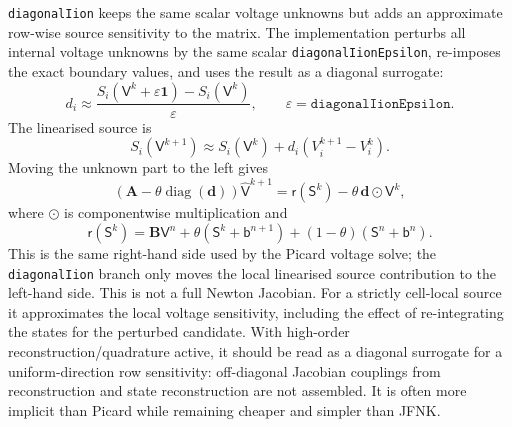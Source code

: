 \documentclass[11pt,a4paper]{article}
\newcommand{\code}[1]{\texttt{\small #1}}
\newcommand{\Aimp}{\mathbf{A}}
\newcommand{\Bimp}{\mathbf{B}}
\begin{document}
\code{diagonalIion} keeps the same scalar voltage unknowns but adds an
approximate row-wise source sensitivity to the matrix. The implementation
perturbs all internal voltage unknowns by the same scalar
\code{diagonalIionEpsilon}, re-imposes the exact boundary values, and uses the
result as a diagonal surrogate:
\begin{equation}
  d_i
  \approx
  \frac{S_i(\mathsf{V}^k+\varepsilon\mathbf{1})-S_i(\mathsf{V}^k)}
       {\varepsilon},
  \qquad
  \varepsilon=\texttt{diagonalIionEpsilon}.
  \label{eq:diagonal-derivative}
\end{equation}
The linearised source is
\begin{equation}
  S_i(\mathsf{V}^{k+1})
  \approx
  S_i(\mathsf{V}^{k})
  + d_i\left(V^{k+1}_i-V^k_i\right).
\end{equation}
Moving the unknown part to the left gives
\begin{equation}
  \left(\Aimp-\theta\operatorname{diag}(\mathbf{d})\right)
  \widehat{\mathsf{V}}^{k+1}
  =
  \mathsf{r}(\mathsf{S}^k)
  -
  \theta\,\mathbf{d}\odot\mathsf{V}^{k},
  \label{eq:diagonal-system}
\end{equation}
where $\odot$ is componentwise multiplication and
\begin{equation}
  \mathsf{r}(\mathsf{S}^{k})
  =
  \Bimp\mathsf{V}^{n}
  +\theta\left(\mathsf{S}^{k}+\mathsf{b}^{n+1}\right)
  +(1-\theta)\left(\mathsf{S}^{n}+\mathsf{b}^{n}\right).
\end{equation}
This is the same right-hand side used by the Picard voltage solve; the
\code{diagonalIion} branch only moves the local linearised source contribution
to the left-hand side. This is not a full Newton Jacobian. For a strictly
cell-local source it approximates the local voltage sensitivity, including the
effect of re-integrating the states for the perturbed candidate. With
high-order reconstruction/quadrature active, it should be read as a diagonal
surrogate for a uniform-direction row sensitivity: off-diagonal Jacobian
couplings from reconstruction and state reconstruction are not assembled. It
is often more implicit than Picard while remaining cheaper and simpler than
JFNK.
\end{document}
